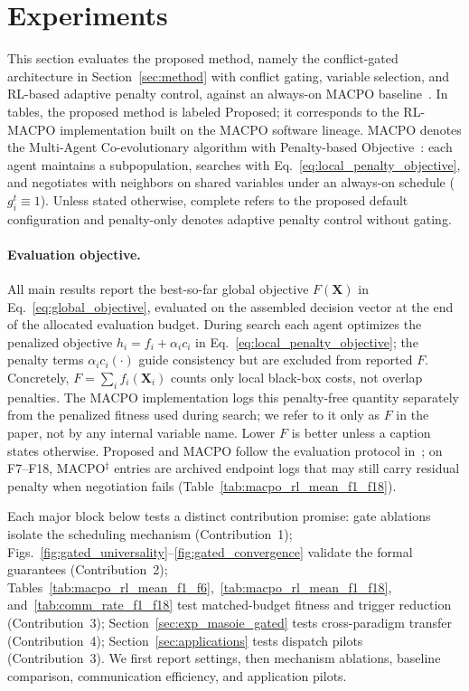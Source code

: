 \documentclass[conference]{IEEEtran}
\begin{document}
\section{Experiments}\label{sec:experiments}
This section evaluates the proposed method, namely the conflict-gated architecture in Section~\ref{sec:method} with conflict gating, variable selection, and RL-based adaptive penalty control, against an always-on MACPO baseline~\cite{ref_macpo}. In tables, the proposed method is labeled Proposed; it corresponds to the RL-MACPO implementation built on the MACPO software lineage. MACPO denotes the Multi-Agent Co-evolutionary algorithm with Penalty-based Objective~\cite{ref_macpo}: each agent maintains a subpopulation, searches with Eq.~\eqref{eq:local_penalty_objective}, and negotiates with neighbors on shared variables under an always-on schedule ($g_i^t\equiv 1$). Unless stated otherwise, complete refers to the proposed default configuration and penalty-only denotes adaptive penalty control without gating.

\paragraph{Evaluation objective.} All main results report the best-so-far global objective $F(\mathbf{X})$ in Eq.~\eqref{eq:global_objective}, evaluated on the assembled decision vector at the end of the allocated evaluation budget. During search each agent optimizes the penalized objective $h_i=f_i+\alpha_i c_i$ in Eq.~\eqref{eq:local_penalty_objective}; the penalty terms $\alpha_i c_i(\cdot)$ guide consistency but are excluded from reported $F$. Concretely, $F=\sum_i f_i(\mathbf{X}_i)$ counts only local black-box costs, not overlap penalties. The MACPO implementation logs this penalty-free quantity separately from the penalized fitness used during search; we refer to it only as $F$ in the paper, not by any internal variable name. Lower $F$ is better unless a caption states otherwise. Proposed and MACPO follow the evaluation protocol in~\cite{ref_macpo}; on F7--F18, MACPO$^{\ddagger}$ entries are archived endpoint logs that may still carry residual penalty when negotiation fails (Table~\ref{tab:macpo_rl_mean_f1_f18}).

Each major block below tests a distinct contribution promise: gate ablations isolate the scheduling mechanism (Contribution~1); Figs.~\ref{fig:gated_universality}--\ref{fig:gated_convergence} validate the formal guarantees (Contribution~2); Tables~\ref{tab:macpo_rl_mean_f1_f6},~\ref{tab:macpo_rl_mean_f1_f18}, and~\ref{tab:comm_rate_f1_f18} test matched-budget fitness and trigger reduction (Contribution~3); Section~\ref{sec:exp_masoie_gated} tests cross-paradigm transfer (Contribution~4); Section~\ref{sec:applications} tests dispatch pilots (Contribution~3). We first report settings, then mechanism ablations, baseline comparison, communication efficiency, and application pilots.
\end{document}
